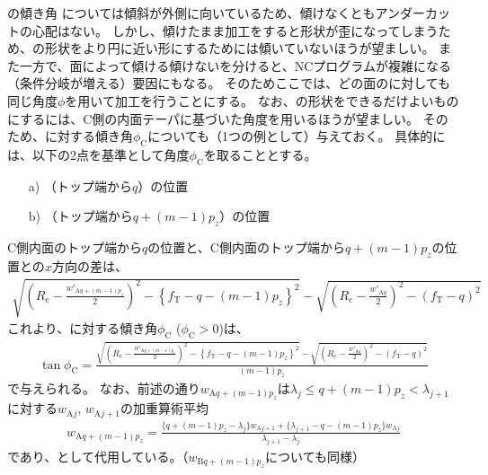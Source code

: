 \begin{\Columnname}{\CfaceDimple の傾き角}
\CfaceDimple については傾斜が外側に向いているため、傾けなくともアンダーカットの心配はない。
しかし、傾けたまま加工をすると形状が歪になってしまうため、\Dimple の形状をより円に近い形にするためには傾いていないほうが望ましい。
また一方で、面によって傾ける傾けないを分けると、NCプログラムが複雑になる（条件分岐が増える）要因にもなる。
そのためここでは、どの面の\Dimple に対しても同じ角度$\phi$を用いて加工を行うことにする。
\tcbline*
なお、\CfaceDimple の形状をできるだけよいものにするには、C側の内面テーパに基づいた角度を用いるほうが望ましい。
そのため、\CfaceDimple に対する傾き角$\phi_\mathrm C$についても（1つの例として）与えておく。
具体的には、以下の2点を基準として角度$\phi_\mathrm C$を取ることとする。
\begin{enumerate}
\item[a)] \CFaceDimpleFirstRow（トップ端から$q$）の位置
\item[b)] \CFaceDimpleLastRow（トップ端から$q+(m-1)p_z$）の位置
\end{enumerate}
C側内面のトップ端から$q$の位置と、C側内面のトップ端から$q+(m-1)p_z$の位置との$x$方向の差は、
\begin{align*}
  \sqrt{\left(R_\mathrm c-\frac{w'_{\mathrm Aq+(m-1)p_z}}2\right)^2
        -\left\{f_\mathrm T-q-(m-1)p_z\right\}^2}
  -\sqrt{\left(R_\mathrm c-\frac{w'_{\mathrm Aq}}2\right)^2-(f_\mathrm T-q)^2}
\end{align*}
これより、\CfaceDimple に対する傾き角$\phi_\mathrm C$ ($\phi_\mathrm C > 0$)は、
\begin{align*}
  \tan\phi_\mathrm C
  = \frac{\displaystyle
          \sqrt{\left(R_\mathrm c-\frac{w'_{\mathrm Aq+(m-1)p_z}}2\right)^2
                -\left\{f_\mathrm T-q-(m-1)p_z\right\}^2}
          -\sqrt{\left(R_\mathrm c-\frac{w'_{\mathrm Aq}}2\right)^2-(f_\mathrm T-q)^2}}
         {(m-1)p_z}
\end{align*}
で与えられる。
なお、前述の通り$w_{\mathrm Aq+(m-1)p_z}$は$\lambda_j \leq q+(m-1)p_z < \lambda_{j+1}$に対する$w_{\mathrm Aj}$, $w_{\mathrm Aj+1}$の加重算術平均
\begin{align*}
  w_{\mathrm Aq+(m-1)p_z}
  = \frac{\{q+(m-1)p_z-\lambda_j\}w_{\mathrm Aj+1}+\{\lambda_{j+1}-q-(m-1)p_z\}w_{\mathrm Aj}}
         {\lambda_{j+1}-\lambda_j}
\end{align*}
であり、\InnerDiameter として代用している。（$w_{\mathrm Bq+(m-1)p_z}$についても同様）
\end{\Columnname}
